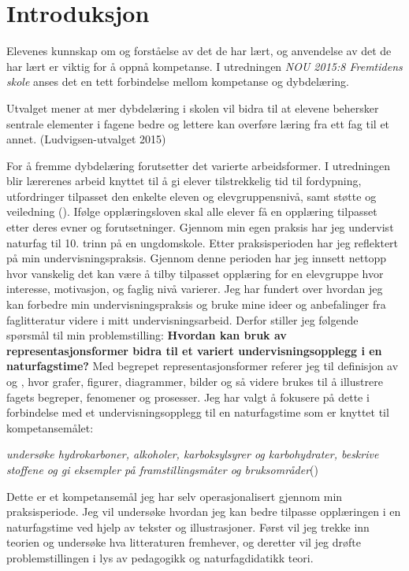\documentclass[main.tex]{subfiles}
\begin{document}
\section*{Introduksjon}

Elevenes kunnskap om og forståelse av det de har lært, og anvendelse av det de har lært er viktig for å oppnå kompetanse. I utredningen \emph{NOU 2015:8 Fremtidens skole} anses det en tett forbindelse mellom kompetanse og dybdelæring.
\begin{displayquote}
Utvalget mener at mer dybdelæring i skolen vil bidra til at elevene behersker sentrale elementer i fagene bedre og lettere kan overføre læring fra ett fag til et annet. (Ludvigsen-utvalget 2015)
\end{displayquote}
For å fremme dybdelæring forutsetter det varierte arbeidsformer. I utredningen blir lærerenes arbeid knyttet til å gi elever tilstrekkelig tid til fordypning, utfordringer tilpasset den enkelte eleven og elevgruppensnivå, samt støtte og veiledning ().
\newline\newline
Ifølge opplæringsloven skal alle elever få en opplæring tilpasset etter deres evner og forutsetninger. Gjennom min egen praksis har jeg undervist naturfag til 10. trinn på en ungdomskole. Etter praksisperioden har jeg reflektert på min undervisningspraksis. Gjennom denne perioden har jeg innsett nettopp hvor vanskelig det kan være å tilby tilpasset opplæring for en elevgruppe hvor interesse, motivasjon, og faglig nivå varierer. Jeg har fundert over hvordan jeg kan forbedre min undervisningspraksis og bruke mine ideer og anbefalinger fra faglitteratur videre i mitt undervisningsarbeid. Derfor stiller jeg følgende spørsmål til min \mbox{problemstilling:}
\newline
\newline
\textbf{Hvordan kan bruk av representasjonsformer bidra til et variert undervisningsopplegg i en naturfagstime?}
\newline
\newline
Med begrepet representasjonsformer referer jeg til definisjon av  og , hvor grafer, figurer, diagrammer, bilder og så videre brukes til å illustrere fagets begreper, fenomener og prosesser. Jeg har valgt å fokusere på dette i forbindelse med et undervisningsopplegg til en naturfagstime som er knyttet til kompetansemålet:
\begin{displayquote}
\emph{undersøke hydrokarboner, alkoholer, karboksylsyrer og karbohydrater, beskrive stoffene og gi eksempler på framstillingsmåter og bruksområder}\newline ()
\end{displayquote}
Dette er et kompetansemål jeg har selv operasjonalisert gjennom min praksisperiode. Jeg vil undersøke hvordan jeg kan bedre tilpasse opplæringen i en naturfagstime ved hjelp av tekster og illustrasjoner. Først vil jeg trekke inn teorien og undersøke hva litteraturen fremhever, og deretter vil jeg drøfte problemstillingen i lys av pedagogikk og naturfagdidatikk teori. 
\end{document}
